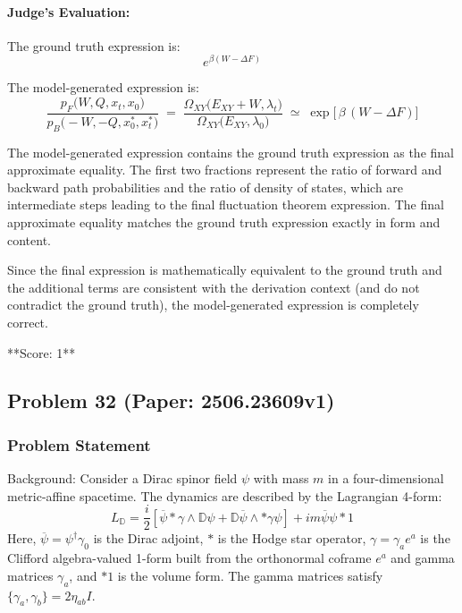 \documentclass[10pt]{article}
\begin{document}
\paragraph*{Judge's Evaluation:}

The ground truth expression is:
\[
e^{\beta(W - \Delta F)}
\]

The model-generated expression is:
\[
\frac{p_F\bigl(W,Q,x_t,x_0\bigr)}{p_B\bigl(-W,-Q,x_0^*,x_t^*\bigr)}
\;=\;
\frac{\Omega_{XY}\bigl(E_{XY}+W,\lambda_t\bigr)}
     {\Omega_{XY}\bigl(E_{XY},\lambda_0\bigr)}
\;\simeq\;
\exp\!\bigl[\,\beta\,(W-\Delta F)\bigr]
\]

The model-generated expression contains the ground truth expression as the final approximate equality. The first two fractions represent the ratio of forward and backward path probabilities and the ratio of density of states, which are intermediate steps leading to the final fluctuation theorem expression. The final approximate equality matches the ground truth expression exactly in form and content.

Since the final expression is mathematically equivalent to the ground truth and the additional terms are consistent with the derivation context (and do not contradict the ground truth), the model-generated expression is completely correct.

**Score: 1**

\newpage
\subsection*{Problem 32 (Paper: 2506.23609v1)}
\subsubsection*{Problem Statement}
Background:
Consider a Dirac spinor field $\psi$ with mass $m$ in a four-dimensional metric-affine spacetime. The dynamics are described by the Lagrangian 4-form:
$${L}_{\mathbb{D}}   = \frac{i}{2} \left[ \overline{\psi} * \gamma  \wedge  \mathbb{D}\psi + \mathbb{D}\overline{\psi} \wedge *\gamma  \psi \right] + im \overline{\psi} \psi *1$$
Here, $\overline{\psi} = \psi^\dagger \gamma_0$ is the Dirac adjoint, $*$ is the Hodge star operator, $\gamma = \gamma_a e^a$ is the Clifford algebra-valued 1-form built from the orthonormal coframe $e^a$ and gamma matrices $\gamma_a$, and $*1$ is the volume form. The gamma matrices satisfy $\{\gamma_a, \gamma_b\} = 2\eta_{ab}I$.
\end{document}

